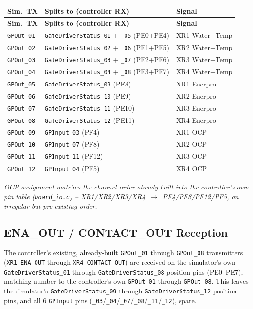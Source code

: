 \documentclass[11pt]{article}
\newcommand{\code}[1]{\texttt{#1}}
\begin{document}
\begin{longtable}{p{0.75in} p{1.85in} p{1.75in}}
  \hline
  \textbf{Sim.\ TX} & \textbf{Splits to (controller RX)} & \textbf{Signal} \\
  \hline
  \endfirsthead
  \hline
  \textbf{Sim.\ TX} & \textbf{Splits to (controller RX)} & \textbf{Signal} \\
  \hline
  \endhead
  \code{GPOut\_01} & \code{GateDriverStatus\_01} + \code{\_05} (PE0+PE4) & XR1 Water+Temp \\
  \code{GPOut\_02} & \code{GateDriverStatus\_02} + \code{\_06} (PE1+PE5) & XR2 Water+Temp \\
  \code{GPOut\_03} & \code{GateDriverStatus\_03} + \code{\_07} (PE2+PE6) & XR3 Water+Temp \\
  \code{GPOut\_04} & \code{GateDriverStatus\_04} + \code{\_08} (PE3+PE7) & XR4 Water+Temp \\
  \code{GPOut\_05} & \code{GateDriverStatus\_09} (PE8) & XR1 Enerpro \\
  \code{GPOut\_06} & \code{GateDriverStatus\_10} (PE9) & XR2 Enerpro \\
  \code{GPOut\_07} & \code{GateDriverStatus\_11} (PE10) & XR3 Enerpro \\
  \code{GPOut\_08} & \code{GateDriverStatus\_12} (PE11) & XR4 Enerpro \\
  \code{GPOut\_09} & \code{GPInput\_03} (PF4) & XR1 OCP \\
  \code{GPOut\_10} & \code{GPInput\_07} (PF8) & XR2 OCP \\
  \code{GPOut\_11} & \code{GPInput\_11} (PF12) & XR3 OCP \\
  \code{GPOut\_12} & \code{GPInput\_04} (PF5) & XR4 OCP \\
  \hline
\end{longtable}

\noindent\textit{OCP assignment matches the channel order already
built into the controller's own pin table (\code{board\_io.c}) --
XR1/XR2/XR3/XR4~$\to$~PF4/PF8/PF12/PF5, an
irregular but pre-existing order.}

\subsection{ENA\_OUT / CONTACT\_OUT Reception}

{\small
The controller's existing, already-built \code{GPOut\_01} through
\code{GPOut\_08} transmitters (\code{XR1\_ENA\_OUT} through
\code{XR4\_CONTACT\_OUT}) are received on the simulator's own
\code{GateDriverStatus\_01} through \code{GateDriverStatus\_08}
position pins (PE0--PE7), matching number to the controller's own
\code{GPOut\_01} through \code{GPOut\_08}. This leaves the simulator's
\code{GateDriverStatus\_09} through \code{GateDriverStatus\_12}
position pins, and all 6 \code{GPInput} pins
(\code{\_03}/\code{\_04}/\code{\_07}/\code{\_08}/\code{\_11}/\code{\_12}),
spare.
}
\end{document}
